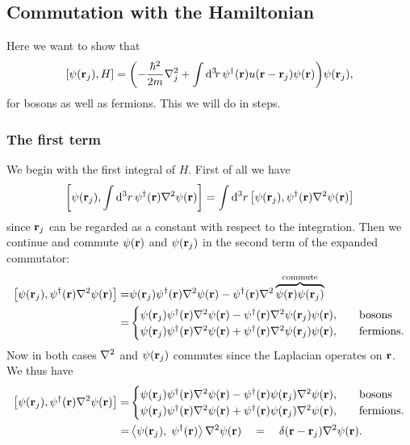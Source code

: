 \documentclass[11pt,letter, swedish, english
]{article}
\begin{document}
\subsection{Commutation with the Hamiltonian}
Here we want to show that 
\begin{equation}
\comm{\psi(\vb{r}_j)}{H}
=\qty(-\frac{\hbar^2}{2m}\laplacian_j
+\int\rd^3\!r\,
\psi^\dagger(\vb{r})
u(\vb{r}-\vb{r}_j)\psi(\vb{r})
)\psi(\vb{r}_j),
\end{equation}
for bosons as well as fermions.
This we will do in steps.

\subsubsection{The first term}
We begin with the first integral of $H$. First of all we have
\begin{equation}
\comm{\psi(\vb{r}_j)}{\int\rd^3r\,
\psi^\dagger(\vb{r})\laplacian\psi(\vb{r})}=
\int\rd^3r\,
\comm{\psi(\vb{r}_j)}
{\psi^\dagger(\vb{r})\laplacian\psi(\vb{r})}
\end{equation}
since $\vb{r}_j$ can be regarded as a constant with respect to the
integration. Then we continue and commute $\psi(\vb{r})$ and
$\psi(\vb{r}_j)$ in the second term of the expanded commutator:
\begin{equation}
\begin{aligned}
\comm{\psi(\vb{r}_j)}
{\psi^\dagger(\vb{r})\laplacian\psi(\vb{r})}
=&\psi(\vb{r}_j)\psi^\dagger(\vb{r})\laplacian\psi(\vb{r})
-\psi^\dagger(\vb{r})\laplacian
\commute{\psi(\vb{r})\psi(\vb{r}_j)}\\
=&\begin{cases}
\psi(\vb{r}_j)\psi^\dagger(\vb{r})\laplacian\psi(\vb{r})
-\psi^\dagger(\vb{r})\laplacian\psi(\vb{r}_j)\psi(\vb{r})
\qcomma&\text{bosons}\\
\psi(\vb{r}_j)\psi^\dagger(\vb{r})\laplacian\psi(\vb{r})
+\psi^\dagger(\vb{r})\laplacian\psi(\vb{r}_j)\psi(\vb{r}),
&\text{fermions}.
\end{cases}
\end{aligned}
\end{equation}
Now in both cases $\laplacian$ and $\psi(\vb{r}_j)$ commutes since the
Laplacian operates on $\vb{r}$. We thus have
\begin{equation}
\begin{aligned}
\comm{\psi(\vb{r}_j)}
{\psi^\dagger(\vb{r})\laplacian\psi(\vb{r})}
=&\begin{cases}
\psi(\vb{r}_j)\psi^\dagger(\vb{r})\laplacian\psi(\vb{r})
-\psi^\dagger(\vb{r})\psi(\vb{r}_j)\laplacian\psi(\vb{r})
\qcomma&\text{bosons}\\
\psi(\vb{r}_j)\psi^\dagger(\vb{r})\laplacian\psi(\vb{r})
+\psi^\dagger(\vb{r})\psi(\vb{r}_j)\laplacian\psi(\vb{r}),
&\text{fermions}.
\end{cases}\\
=&\scomm{\psi(\vb{r}_j)}{\psi^\dagger(\vb{r})}
\laplacian\psi(\vb{r})%
\quad=\quad
\delta(\vb{r}-\vb{r}_j)\laplacian\psi(\vb{r}).
\end{aligned}
\end{equation}
\end{document}
